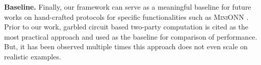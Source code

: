 \textbf{Baseline.} Finally, our framework \tool can serve as a meaningful baseline for future works on hand-crafted \mpc protocols for specific functionalities such as \textsc{MiniONN} \cite{minionn}. 
Prior to our work, garbled circuit based two-party computation is cited as the most practical approach and used as the baseline for comparison of performance. But, it has been observed multiple times this approach does not even scale on realistic examples.



%
%
%
%
%
%
%
%
%
%




\vspace{10pt}

